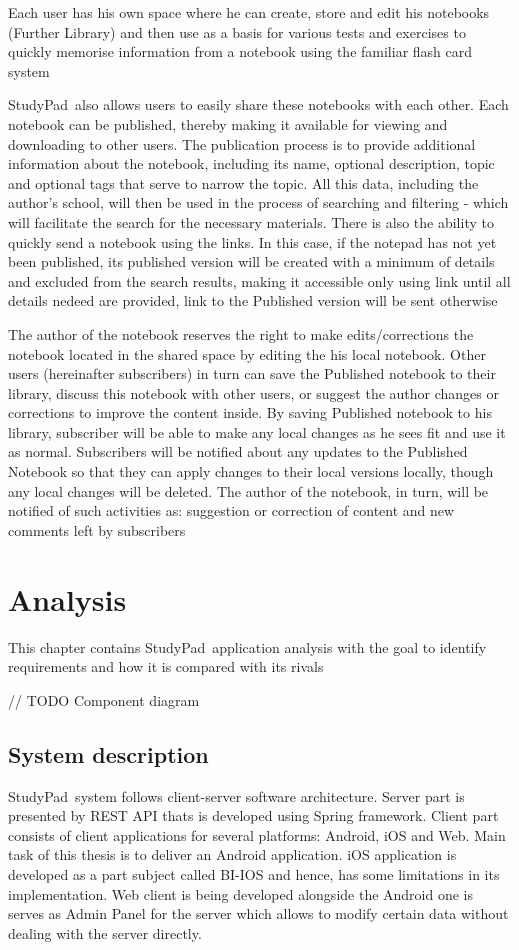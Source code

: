 \documentclass[thesis=B,english]{FITthesis}[2012/10/20]
\newcommand{\appname}{StudyPad}
\begin{document}
Each user has his own space where he can create, store and edit his notebooks (Further Library) and then use as a basis for various tests and exercises to quickly memorise information from a notebook using the familiar flash card system

\appname\ also allows users to easily share these notebooks with each other. Each notebook can be published, thereby making it available for viewing and downloading to other users.
The publication process is to provide additional information about the notebook, including its name, optional description, topic and optional tags that serve to narrow the topic. All this data, including the author's school, will then be used in the process of searching and filtering - which will facilitate the search for the necessary materials. There is also the ability to quickly send a notebook using the links. In this case, if the notepad has not yet been published, its published version will be created with a minimum of details and excluded from the search results, making it accessible only using link until all details nedeed are provided, link to the Published version will be sent otherwise


The author of the notebook reserves the right to make edits/corrections the notebook located in the shared space by editing the his local notebook. Other users (hereinafter subscribers) in turn can save the Published notebook to their library, discuss this notebook with other users, or suggest the author changes or corrections to improve the content inside. By saving Published notebook to his library, subscriber will be able to make any local changes as he sees fit and use it as normal. Subscribers will be notified about any updates to the Published Notebook so that they can apply changes to their local versions locally, though any local changes will be deleted. The author of the notebook, in turn, will be notified of such activities as: suggestion or correction of content and new comments left by subscribers

\newpage
\chapter{Analysis}

This chapter contains \appname\ application analysis with the goal to identify requirements and how it is compared with its rivals

// TODO Component diagram

\section{System description}
 \appname\ system follows client-server software architecture. Server part is presented by REST API thats is developed using Spring framework. Client part consists of  client applications for several platforms: Android, iOS and Web. Main task of this thesis is to deliver an Android application. iOS  application is developed as a part subject called BI-IOS and hence, has some limitations in its implementation. Web client is being developed alongside the Android one is serves as Admin Panel for the server which allows to modify certain data without dealing with the server directly.
 
\end{document}
